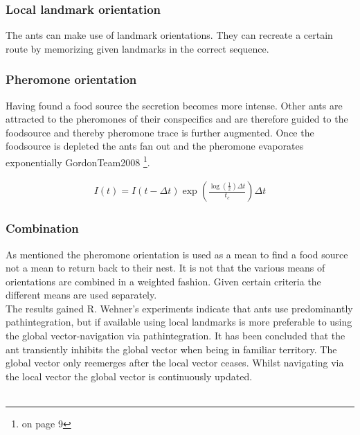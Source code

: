 \documentclass[11pt]{article}
\begin{document}
\subsubsection{Local landmark orientation }
The ants can make use of landmark orientations. They can recreate a certain route by memorizing given landmarks in the correct sequence.

\subsubsection{Pheromone orientation}
Having found a food source the secretion becomes more intense. Other ants are attracted to the pheromones of their conspecifics and are therefore guided to the foodsource and thereby pheromone trace is further augmented. Once the foodsource is depleted the ants fan out and the pheromone evaporates exponentially GordonTeam2008\cite{GordonTeam2008} \footnote{on page 9}.

 \begin{align*}
 I(t)=I(t - \Delta t) \exp (\frac{\log (\frac{1}{2}) \Delta  t}{t_{c}})\Delta t 
 \end{align*}
 
 
 










\subsubsection{Combination}
As mentioned the pheromone orientation is used as a mean to find a food source not a mean to return back to their nest.
It is not that the various means of orientations are combined in a weighted fashion. Given certain criteria the different means are used separately.\\
The results gained R. Wehner's experiments indicate that ants use predominantly pathintegration, but if available using local landmarks is more preferable to using the global vector-navigation via pathintegration. It has been concluded that the ant transiently inhibits the global vector when being in familiar territory. The global vector only reemerges after the local vector ceases. Whilst navigating via the local vector the global vector is continuously updated.
\\ \
\end{document}
